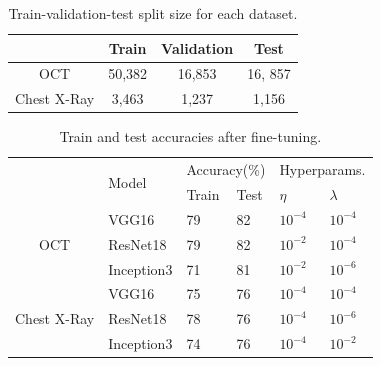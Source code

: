 \begin{table}[ht]
\begin{tabular}{cccc}
 & Train & Validation & Test \\ \hline
\hline
OCT & 50,382 & 16,853 & 16, 857 \\ \hline
Chest X-Ray & 3,463 & 1,237 & 1,156 \\ \hline
\end{tabular}
\caption{Train-validation-test split size for each dataset.}
\vspace{-6mm}
\label{tbl:dataset_sizes}
\end{table}

\begin{table}[ht]
\begin{tabular}{|c|l|l|l|l|l|l|}
\hline
\multicolumn{1}{|l|}{\multirow{3}{*}{}} & \multirow{3}{*}{Model} & \multicolumn{2}{l|}{\multirow{2}{*}{Accuracy(\%)}} & \multicolumn{3}{l|}{\multirow{2}{*}{Hyperparams.}} \\
\multicolumn{1}{|l|}{} &  & \multicolumn{2}{l|}{} & \multicolumn{3}{l|}{} \\ \cline{3-7} 
\multicolumn{1}{|l|}{} &  & Train & Test & \multicolumn{2}{l|}{$\eta$} & $\lambda$ \\ \hline
\multirow{3}{*}{OCT} & VGG16 & 79 & 82 & \multicolumn{2}{l|}{$10^{-4}$} & $10^{-4}$ \\ \cline{2-7} 
 & ResNet18 & 79 & 82 & \multicolumn{2}{l|}{$10^{-2}$} & $10^{-4}$ \\ \cline{2-7} 
 & Inception3 & 71 & 81 & \multicolumn{2}{l|}{$10^{-2}$} & $10^{-6}$ \\ \hline
\multirow{3}{*}{Chest X-Ray} & VGG16 & 75 & 76 & \multicolumn{2}{l|}{$10^{-4}$} & $10^{-4}$ \\ \cline{2-7} 
 & ResNet18 & 78 & 76 & \multicolumn{2}{l|}{$10^{-4}$} & $10^{-6}$ \\ \cline{2-7} 
 & Inception3 & 74 & 76 & \multicolumn{2}{l|}{$10^{-4}$} & $10^{-2}$ \\ \hline
\end{tabular}
\caption{Train and test accuracies after fine-tuning.}
\vspace{-6mm}
\label{tbl:finetune_accuracies}
\end{table}


